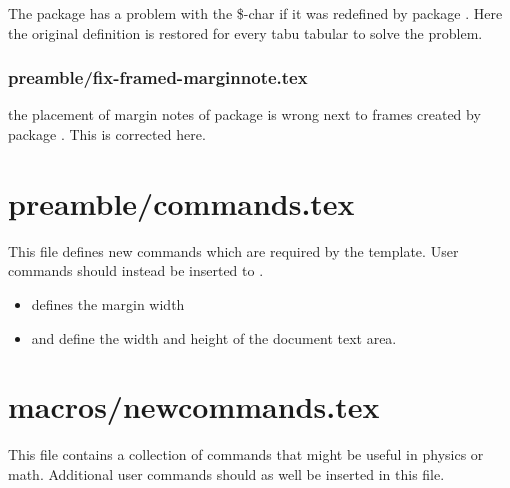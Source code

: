 The package  has a problem with the \$-char if it was redefined by package . Here the original definition is restored for every tabu tabular to solve the problem.


\subsubsection{preamble/fix-framed-marginnote.tex}

the placement of margin notes of package  is wrong next to frames created by package . This is corrected here.



\section{preamble/commands.tex}

This file defines new commands which are required by the template. User commands should instead be inserted to .

\begin{itemize}
\item {} defines the margin width
\item {} and  define the width and height of the document text area.
\end{itemize}


\section{macros/newcommands.tex}

This file contains a collection of commands that might be useful in physics or math. Additional user commands should as well be inserted in this file.


